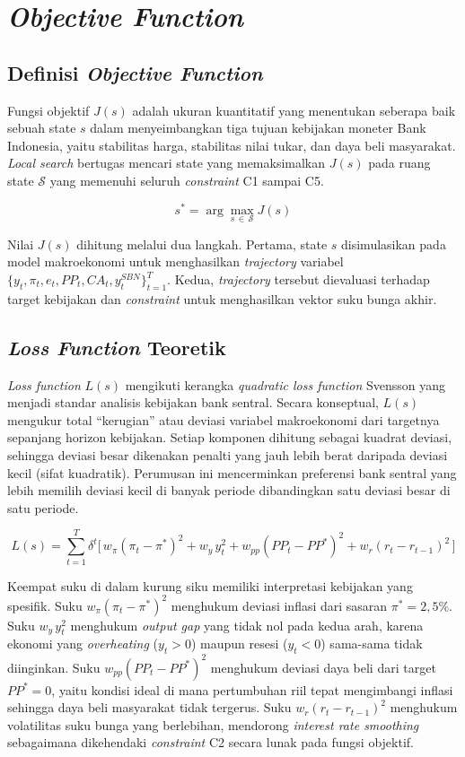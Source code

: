 \section{\textit{Objective Function}}

\subsection{Definisi \textit{Objective Function}}

Fungsi objektif $J(s)$ adalah ukuran kuantitatif yang menentukan seberapa baik sebuah state $s$ dalam menyeimbangkan tiga tujuan kebijakan moneter Bank Indonesia, yaitu stabilitas harga, stabilitas nilai tukar, dan daya beli masyarakat. \textit{Local search} bertugas mencari state yang memaksimalkan $J(s)$ pada ruang state $\mathcal{S}$ yang memenuhi seluruh \textit{constraint} C1 sampai C5.

\[
    s^{*} = \arg\max_{s \,\in\, \mathcal{S}} J(s)
\]

Nilai $J(s)$ dihitung melalui dua langkah. Pertama, state $s$ disimulasikan pada model makroekonomi untuk menghasilkan \textit{trajectory} variabel $\{y_t, \pi_t, e_t, PP_t, CA_t, y_t^{SBN}\}_{t=1}^{T}$. Kedua, \textit{trajectory} tersebut dievaluasi terhadap target kebijakan dan \textit{constraint} untuk menghasilkan vektor suku bunga akhir.

\subsection{\textit{Loss Function} Teoretik}

\textit{Loss function} $L(s)$ mengikuti kerangka \textit{quadratic loss function} Svensson \cite{svensson1997} yang menjadi standar analisis kebijakan bank sentral. Secara konseptual, $L(s)$ mengukur total ``kerugian'' atau deviasi variabel makroekonomi dari targetnya sepanjang horizon kebijakan. Setiap komponen dihitung sebagai kuadrat deviasi, sehingga deviasi besar dikenakan penalti yang jauh lebih berat daripada deviasi kecil (sifat kuadratik). Perumusan ini mencerminkan preferensi bank sentral yang lebih memilih deviasi kecil di banyak periode dibandingkan satu deviasi besar di satu periode.

\[
    L(s) = \sum_{t=1}^{T} \delta^{t} \Big[\, w_\pi (\pi_t - \pi^{*})^2 + w_y \, y_t^{2} + w_{pp} (PP_t - PP^{*})^2 + w_r (r_t - r_{t-1})^2 \,\Big]
\]

Keempat suku di dalam kurung siku memiliki interpretasi kebijakan yang spesifik. Suku $w_\pi (\pi_t - \pi^{*})^2$ menghukum deviasi inflasi dari sasaran $\pi^{*} = 2{,}5\%$. Suku $w_y \, y_t^{2}$ menghukum \textit{output gap} yang tidak nol pada kedua arah, karena ekonomi yang \textit{overheating} ($y_t > 0$) maupun resesi ($y_t < 0$) sama-sama tidak diinginkan. Suku $w_{pp} (PP_t - PP^{*})^2$ menghukum deviasi daya beli dari target $PP^{*} = 0$, yaitu kondisi ideal di mana pertumbuhan riil tepat mengimbangi inflasi sehingga daya beli masyarakat tidak tergerus. Suku $w_r (r_t - r_{t-1})^2$ menghukum volatilitas suku bunga yang berlebihan, mendorong \textit{interest rate smoothing} sebagaimana dikehendaki \textit{constraint} C2 secara lunak pada fungsi objektif.

